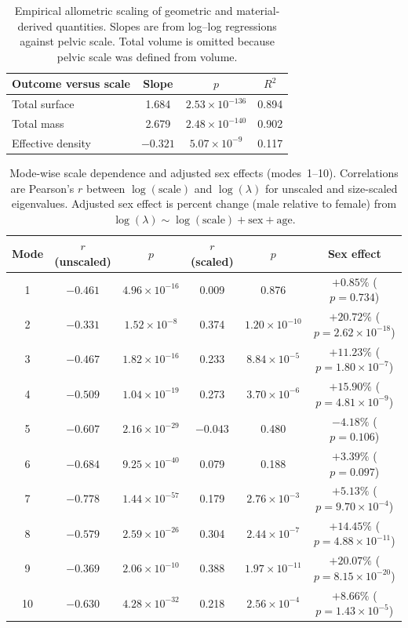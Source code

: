 \documentclass[openacc]{rsproca_new}
\begin{document}
\begin{table}[p]
\centering
\caption{Empirical allometric scaling of geometric and material-derived quantities. Slopes are from log--log regressions against pelvic scale. Total volume is omitted because pelvic scale was defined from volume.}
\label{tab:allometry}
\begin{tabular}{lccc}
\toprule
Outcome versus scale & Slope & $p$ & $R^2$ \\
\midrule
Total surface & 1.684 & $2.53 \times 10^{-136}$ & 0.894 \\
Total mass & 2.679 & $2.48 \times 10^{-140}$ & 0.902 \\
Effective density & $-0.321$ & $5.07 \times 10^{-9}$ & 0.117 \\
\bottomrule
\end{tabular}
\end{table}

\begin{table}[p]
\centering
\caption{Mode-wise scale dependence and adjusted sex effects (modes~1--10). Correlations are Pearson's $r$ between $\log(\mathrm{scale})$ and $\log(\lambda)$ for unscaled and size-scaled eigenvalues. Adjusted sex effect is percent change (male relative to female) from $\log(\lambda) \sim \log(\mathrm{scale}) + \mathrm{sex} + \mathrm{age}$.}
\label{tab:modes}
\begin{tabular}{cccccc}
\toprule
Mode & $r$ (unscaled) & $p$ & $r$ (scaled) & $p$ & Sex effect \\
\midrule
1 & $-0.461$ & $4.96 \times 10^{-16}$ & 0.009 & 0.876 & $+0.85\%$ ($p=0.734$) \\
2 & $-0.331$ & $1.52 \times 10^{-8}$ & 0.374 & $1.20 \times 10^{-10}$ & $+20.72\%$ ($p=2.62 \times 10^{-18}$) \\
3 & $-0.467$ & $1.82 \times 10^{-16}$ & 0.233 & $8.84 \times 10^{-5}$ & $+11.23\%$ ($p=1.80 \times 10^{-7}$) \\
4 & $-0.509$ & $1.04 \times 10^{-19}$ & 0.273 & $3.70 \times 10^{-6}$ & $+15.90\%$ ($p=4.81 \times 10^{-9}$) \\
5 & $-0.607$ & $2.16 \times 10^{-29}$ & $-0.043$ & 0.480 & $-4.18\%$ ($p=0.106$) \\
6 & $-0.684$ & $9.25 \times 10^{-40}$ & 0.079 & 0.188 & $+3.39\%$ ($p=0.097$) \\
7 & $-0.778$ & $1.44 \times 10^{-57}$ & 0.179 & $2.76 \times 10^{-3}$ & $+5.13\%$ ($p=9.70 \times 10^{-4}$) \\
8 & $-0.579$ & $2.59 \times 10^{-26}$ & 0.304 & $2.44 \times 10^{-7}$ & $+14.45\%$ ($p=4.88 \times 10^{-11}$) \\
9 & $-0.369$ & $2.06 \times 10^{-10}$ & 0.388 & $1.97 \times 10^{-11}$ & $+20.07\%$ ($p=8.15 \times 10^{-20}$) \\
10 & $-0.630$ & $4.28 \times 10^{-32}$ & 0.218 & $2.56 \times 10^{-4}$ & $+8.66\%$ ($p=1.43 \times 10^{-5}$) \\
\bottomrule
\end{tabular}
\end{table}
\end{document}
